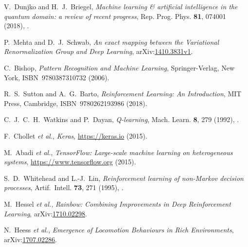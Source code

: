 \documentclass[11pt, a4paper]{report} %
\begin{document}
\begin{thebibliography}{99}
V.~Dunjko and H.~J.~Briegel, \textit{Machine learning \& artificial intelligence in the quantum domain: a review of recent progress}, Rep. Prog. Phys. \textbf{81}, 074001 (2018), .



P.~Mehta and D.~J.~Schwab, \textit{An exact mapping between the Variational Renormalization Group and Deep Learning}, arXiv:\href{https://arxiv.org/abs/1410.3831v1}{1410.3831v1}. 




C.~Bishop, \emph{Pattern Recognition and Machine Learning}, Springer-Verlag, New York, ISBN~9780387310732 (2006).


R.~S.~Sutton and A.~G.~Barto, \emph{Reinforcement Learning: An Introduction}, MIT Press, Cambridge, ISBN~9780262193986 (2018).




C.~J.~C.~H.~Watkins and P.~Dayan, \textit{Q-learning}, Mach. Learn. \textbf{8}, 279 (1992), .




F.~Chollet \textit{et al.}, \emph{Keras}, \href{https://keras.io}{https://keras.io} (2015).





M.~Abadi \textit{et al.}, \emph{{TensorFlow}: Large-scale machine learning on heterogeneous systems}, \href{https://www.tensorflow.org}{https://www.tensorflow.org} (2015).





S.~D.~Whitehead and L.-J.~Lin, \textit{Reinforcement learning of non-Markov decision processes}, Artif.~Intell. \textbf{73}, 271 (1995), .




M.~Hessel \textit{et al.}, \textit{Rainbow: Combining Improvements in Deep Reinforcement Learning}, arXiv:\href{https://arxiv.org/abs/1710.02298}{1710.02298}.



N.~Heess \textit{et al.}, \textit{Emergence of Locomotion Behaviours in Rich Environments}, arXiv:\href{https://arxiv.org/abs/1707.02286}{1707.02286}.




\end{thebibliography}
\end{document}
